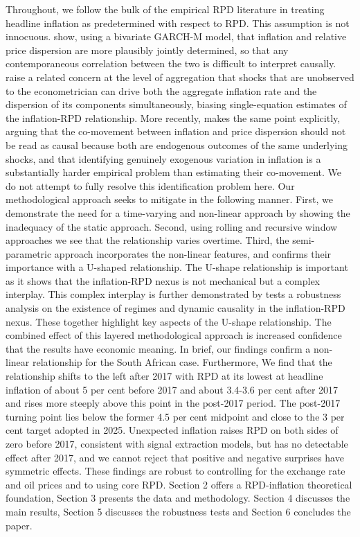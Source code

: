 \documentclass[
  letterpaper,
  DIV=11,
  numbers=noendperiod]{scrartcl}
\begin{document}
Throughout, we follow the bulk of the empirical RPD literature in
treating headline inflation as predetermined with respect to RPD. This
assumption is not innocuous. \citet{grier1996} show, using a bivariate
GARCH-M model, that inflation and relative price dispersion are more
plausibly jointly determined, so that any contemporaneous correlation
between the two is difficult to interpret causally. \citet{parsley1996}
raise a related concern at the level of aggregation that shocks that are
unobserved to the econometrician can drive both the aggregate inflation
rate and the dispersion of its components simultaneously, biasing
single-equation estimates of the inflation-RPD relationship. More
recently, \citet{sheremirov2020} makes the same point explicitly,
arguing that the co-movement between inflation and price dispersion
should not be read as causal because both are endogenous outcomes of the
same underlying shocks, and that identifying genuinely exogenous
variation in inflation is a substantially harder empirical problem than
estimating their co-movement. We do not attempt to fully resolve this
identification problem here. Our methodological approach seeks to
mitigate in the following manner. First, we demonstrate the need for a
time-varying and non-linear approach by showing the inadequacy of the
static approach. Second, using rolling and recursive window approaches
we see that the relationship varies overtime. Third, the semi-parametric
approach incorporates the non-linear features, and confirms their
importance with a U-shaped relationship. The U-shape relationship is
important as it shows that the inflation-RPD nexus is not mechanical but
a complex interplay. This complex interplay is further demonstrated by
tests a robustness analysis on the existence of regimes and dynamic
causality in the inflation-RPD nexus. These together highlight key
aspects of the U-shape relationship. The combined effect of this layered
methodological approach is increased confidence that the results have
economic meaning. In brief, our findings confirm a non-linear
relationship for the South African case. Furthermore, We find that the
relationship shifts to the left after 2017 with RPD at its lowest at
headline inflation of about 5 per cent before 2017 and about 3.4-3.6 per
cent after 2017 and rises more steeply above this point in the post-2017
period. The post-2017 turning point lies below the former 4.5 per cent
midpoint and close to the 3 per cent target adopted in 2025. Unexpected
inflation raises RPD on both sides of zero before 2017, consistent with
signal extraction models, but has no detectable effect after 2017, and
we cannot reject that positive and negative surprises have symmetric
effects. These findings are robust to controlling for the exchange rate
and oil prices and to using core RPD. Section 2 offers a RPD-inflation
theoretical foundation, Section 3 presents the data and methodology.
Section 4 discusses the main results, Section 5 discusses the robustness
tests and Section 6 concludes the paper.
\end{document}
